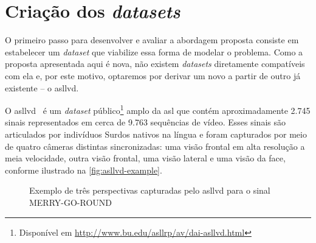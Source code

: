 \section{Criação dos \textit{datasets}}
\label{sec:metodos-datasets}

O primeiro passo para desenvolver e avaliar a abordagem proposta consiste em estabelecer um \textit{dataset} que viabilize essa forma de modelar o problema. Como a proposta apresentada aqui é nova, não existem \textit{datasets} diretamente compatíveis com ela e, por este motivo, optaremos por derivar um novo a partir de outro já existente -- o \acrfull{asllvd}.

O \acrshort{asllvd}~\cite{athitsos-2008-asllvd,neidle-2012-asllvd} é um \textit{dataset} público\footnote{Disponível em \url{http://www.bu.edu/asllrp/av/dai-asllvd.html}} amplo da \acrshort{asl} que contém aproximadamente 2.745 sinais representados em cerca de 9.763 sequências de vídeo. Esses sinais são articulados por indivíduos Surdos nativos na língua e foram capturados por meio de quatro câmeras distintas sincronizadas: uma visão frontal em alta resolução a meia velocidade, outra visão frontal, uma visão lateral e uma visão da face, conforme ilustrado na \autoref{fig:asllvd-example}.

\begin{figure}[ht!]
    \centering
    \caption{\textmd{Exemplo de três perspectivas capturadas pelo \acrshort{asllvd} para o sinal MERRY-GO-ROUND}}
    \label{fig:asllvd-example}
\end{figure}


